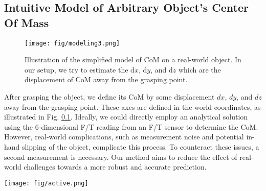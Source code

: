 \subsection{Intuitive Model of Arbitrary Object's Center Of Mass}
\label{model}
\begin{figure}[htbp]
\begin{center}
\texttt{[image: fig/modeling3.png]}
\end{center}
\caption{Illustration of the simplified model of CoM on a real-world object. In our setup, we try to estimate the $\mathrm{d}x$, $\mathrm{d}y$, and $\mathrm{d}z$ which are the displacement of CoM away from the grasping point.}
\label{model_figure}
\vspace{-3mm}
\end{figure}

After grasping the object, we define its CoM by some displacement $dx$, $dy$, and $dz$ away from the grasping point. These axes are defined in the world coordinates, as illustrated in Fig. \ref{model}.
Ideally, we could directly employ an analytical solution using the 6-dimensional F/T reading from an F/T sensor to determine the CoM. However, real-world complications, such as measurement noise and potential in-hand slipping of the object, complicate this process. To counteract these issues, a second measurement is necessary. %
Our method aims to reduce the effect of real-world challenges towards a more robust and accurate prediction.


\begin{figure*}[htbp]
\vspace{2mm}
\begin{center}
\texttt{[image: fig/active.png]}
\end{center}
\caption{a) Flowchart for training Bayesian Neural Network. We train BNN with Markov Chain Monte Carlo and No U-Turn Sampler iteratively. b) Flowchart for training an active perception module. We calculate the score from two orientations as the supervised label of the ActiveNet. We use the first prediction's mean and standard deviation along with the second angle as the input to the network. c) Flowchart for inferencing with U-GRAPH. The robot first grasps with a fixed orientation, then passes the F/T reading with (0, 0) as orientations into the BNN. We use ActiveNet and grid search to find the second action. We pass the second F/T reading with the orientation through BNN to get a secondary prediction and join that with the first prediction to form the posterior prediction.}
\label{active}
\vspace{-3mm}
\end{figure*} 

